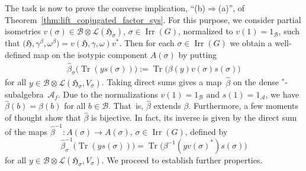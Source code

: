 \documentclass[pdftex]{sigma}
\numberwithin{equation}{section}
\newcommand*{\tensor}{\otimes}		%
\DeclareMathOperator{\Tr}{Tr}		%
\newcommand*{\Star}{$^*$\nobreakdash}
\newcommand*{\hilb}{\mathfrak}		%
\newcommand*{\alg}{\mathcal}		%
\newcommand*{\hH}{\hilb{H}}			%
\newcommand*{\one}{1}				%
\newcommand*{\aA}{\alg{A}}			%
\newcommand*{\aB}{\alg{B}} 			%
\newcommand*{\End}{\mathcal{L}} %
\DeclareMathOperator{\Irrep}{Irr} 			%
\begin{document}
The task is now to prove the converse implication, ``(b)$\Rightarrow$(a)'', of Theorem~\ref{thm:lift_conjugated_factor_sys}.
For this purpose, we consider partial isometries $v(\sigma) \in \aB \tensor \End(\hH_\sigma)$, $\sigma \in \Irrep(G)$, normalized to $v(1) = \one_\aB$, such that $ \big(\hH, \gamma^\beta, \omega^\beta\big) = v (\hH, \gamma, \omega) v^*$.
Then for each $\sigma \in \Irrep(G)$ we obtain a well-defined map on the isotypic component $A(\sigma)$ by putting
\begin{gather}\label{eq:beta}
	\hat\beta_\sigma \bigl( \Tr (y s(\sigma)) \bigr) := \Tr \bigl( \beta(y) v(\sigma) s(\sigma) \bigr)
\end{gather}
for all $y\in \aB \tensor \End(\hH_\sigma, V_\sigma)$.
Taking direct sums gives a map~$\hat\beta$ on the dense \Star-subalgebra~$\aA_f$.
Due to the normalizations $v(1) = \one_\aB$ and $s(1) = \one_\aA$, we have $\hat \beta(b) = \beta(b)$ for all $b \in \aB$.
That~is, $\hat \beta$ extends $\beta$.
Furthermore, a few moments of thought show that $\hat \beta$ is bijective.
In fact, its inverse is given by the direct sum of the maps $\hat\beta^{-1}\colon A(\sigma) \to A(\sigma)$, $\sigma \in \Irrep(G)$, defined by
\[
\hat\beta^{-1}_\sigma \bigl(\Tr ( y s(\sigma)) \bigr)
	= \Tr \bigl( \beta^{-1} (y v(\sigma)^*) s(\sigma) \bigr)
\] for all $y \in \aB \tensor \End(\hH_\sigma, V_\sigma)$.
We proceed to establish further properties.
\end{document}
